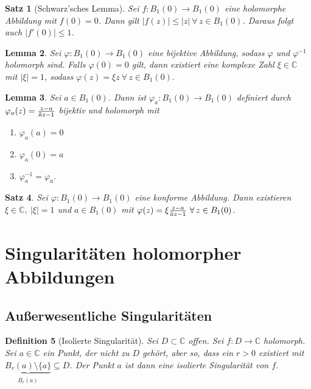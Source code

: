 \documentclass[a4paper,12pt]{article}
\theoremstyle{newthm}
\newtheorem{thm}{Satz}[subsection]
\newtheorem{lem}[thm]{Lemma}
\theoremstyle{newdef}
\newtheorem{defn}[thm]{Definition}
\theoremstyle{newrem}
\newcommand{\C}{\mathbb{C}}
\newcommand{\overbar}[1]{\mkern 1.5mu\overline{\mkern-1.5mu#1\mkern-1.5mu}\mkern 1.5mu}
\begin{document}
		\begin{thm}[Schwarz'sches Lemma]
			Sei $ f: B_1(0) \to B_1(0) $ eine holomorphe Abbildung mit $f(0)=0$. Dann gilt $ |f(z)| \leq |z|\ \forall\, z \in B_1(0) $. Daraus folgt auch $ |f'(0)| \leq 1 $.
		\end{thm}
		
		\begin{lem}
			Sei $ \varphi: B_1(0) \to B_1(0) $ eine bijektive Abbildung, sodass $ \varphi $ und $ \varphi^{-1} $ holomorph sind. Falls $ \varphi(0)=0 $ gilt, dann existiert eine komplexe Zahl $ \xi \in \C $ mit $ |\xi|=1 $, sodass $ \varphi(z) = \xi z \ \forall\, z \in B_1(0). $
		\end{lem}
		
		\begin{lem}
			Sei $ a \in B_1(0) $. Dann ist $ \varphi_a: B_1(0) \to B_1(0) $ definiert durch $ \varphi_a(z) = \frac{z-a}{\overbar{a}z-1} $ bijektiv und holomorph mit 
			\begin{enumerate}[label={\roman*})]
				\item $\varphi_a(a)=0$
				\item $ \varphi_a(0)=a $
				\item $ \varphi_a^{-1} = \varphi_a. $
			\end{enumerate}
		\end{lem}
		
		\begin{thm}
			Sei $ \varphi: B_1(0) \to B_1(0) $ eine konforme Abbildung. Dann existieren $ \xi \in \C,\ |\xi| = 1 $ und $ a \in B_1(0) $ mit $ \varphi(z) = \xi \frac{z-a}{\overbar{a}z-1}\ \forall\, z \in B_1(0) $.
		\end{thm}
		



\section[Singularitäten]{Singularitäten holomorpher Abbildungen}
	
	\subsection{Außerwesentliche Singularitäten}
		
		\begin{defn}[Isolierte Singularität]
			Sei $ D \subset \C $ offen. Sei $ f: D \to \C $ holomorph. Sei $ a \in \C $ ein Punkt, der nicht zu $D$ gehört, aber so, dass ein $r>0$ existiert mit $ \underbrace{B_r(a) \setminus \{a\}}_{\dot{B_r(a)}} \subseteq D $. Der Punkt $a$ ist dann eine \emph{isolierte Singularität} von $f$.
		\end{defn}
		
\end{document}
